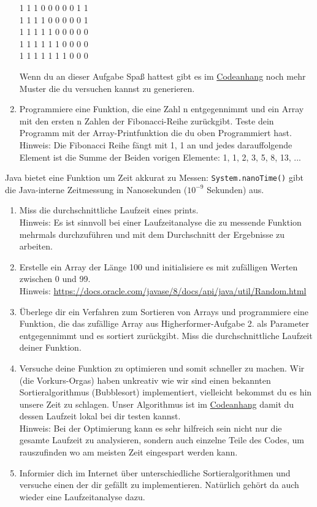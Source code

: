 \documentclass{../../sheet}
\begin{document}
\begin{enumerate}
\begin{ausgabe}
              1 1 1 0 0 0 0 0 1 1 \\
              1 1 1 1 0 0 0 0 0 1 \\
              1 1 1 1 1 0 0 0 0 0 \\
              1 1 1 1 1 1 0 0 0 0 \\
              1 1 1 1 1 1 1 0 0 0
          \end{ausgabe}
          Wenn du an dieser Aufgabe Spaß hattest gibt es im \hyperlink{Aufgabe_4}{Codeanhang} noch mehr Muster die du versuchen kannst zu generieren.
    \item Programmiere eine Funktion, die eine Zahl n entgegennimmt und ein Array mit den ersten n Zahlen der Fibonacci-Reihe zurückgibt. Teste dein Programm mit der Array-Printfunktion die du oben Programmiert hast.\\
          Hinweis: Die Fibonacci Reihe fängt mit 1, 1 an und jedes darauffolgende Element ist die Summe der Beiden vorigen Elemente: 1, 1, 2, 3, 5, 8, 13, ...

\end{enumerate}

\newpage
{}
Java bietet eine Funktion um Zeit akkurat zu Messen: \texttt{System.nanoTime()} gibt die Java-interne Zeitmessung in Nanosekunden ($10^{-9}$ Sekunden) aus.
\begin{enumerate}
    \item Miss die durchschnittliche Laufzeit eines prints.\\
          Hinweis: Es ist sinnvoll bei einer Laufzeitanalyse die zu messende Funktion mehrmals durchzuführen und mit dem Durchschnitt der Ergebnisse zu arbeiten.
    \item Erstelle ein Array der Länge 100 und initialisiere es mit zufälligen Werten zwischen 0 und 99.\\
          Hinweis: \url{https://docs.oracle.com/javase/8/docs/api/java/util/Random.html}
    \item Überlege dir ein Verfahren zum Sortieren von Arrays und programmiere eine Funktion, die das zufällige Array aus Higherformer-Aufgabe 2. als Parameter entgegennimmt und es sortiert zurückgibt. Miss die durchschnittliche Laufzeit deiner Funktion.
    \item Versuche deine Funktion zu optimieren und somit schneller zu machen. Wir (die Vorkurs-Orgas) haben unkreativ wie wir sind einen bekannten Sortieralgorithmus (Bubblesort) implementiert, vielleicht bekommst du es hin unsere Zeit zu schlagen. Unser Algorithmus ist im \hyperlink{Highperformer}{Codeanhang} damit du dessen Laufzeit lokal bei dir testen kannst.\\
          Hinweis: Bei der Optimierung kann es sehr hilfreich sein nicht nur die gesamte Laufzeit zu analysieren, sondern auch einzelne Teile des Codes, um rauszufinden wo am meisten Zeit eingespart werden kann.
    \item Informier dich im Internet über unterschiedliche Sortieralgorithmen und versuche einen der dir gefällt zu implementieren. Natürlich gehört da auch wieder eine Laufzeitanalyse dazu.
\end{enumerate}
\end{document}
